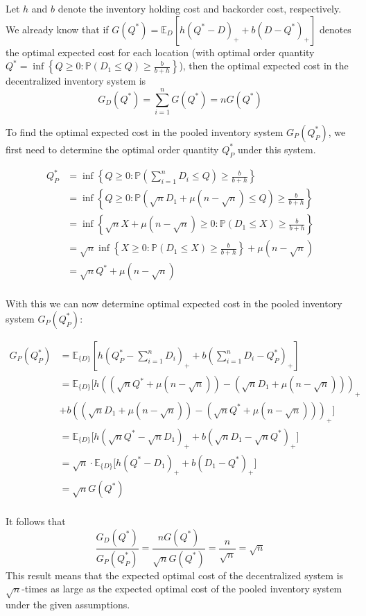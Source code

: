 \documentclass[11pt, oneside]{article}   	%
\begin{document}
Let $h$ and $b$ denote the inventory holding cost and backorder cost, respectively. We already know that if $G(Q^*) = \mathbb{E}_D[h(Q^*-D)_+ + b(D-Q^*)_+]$ denotes the optimal expected cost for each location (with optimal order quantity $Q^* = \inf \left\{ Q \geq 0: \mathbb{P}\left(D_1 \leq Q \right) \geq \frac{b}{b+h} \right\}$), then the optimal expected cost in the decentralized inventory system is
$$G_D(Q^*) = \sum_{i=1}^n G(Q^*) = n G(Q^*)$$

To find the optimal expected cost in the pooled inventory system $G_P(Q_P^*)$, we first need to determine the optimal order quantity $Q_P^*$ under this system.

\begin{align*}
Q_P^* &=  \inf \left\{ Q \geq 0: \mathbb{P}\left( \sum_{i=1}^n D_i \leq Q \right) \geq \frac{b}{b+h} \right\}\\
&=  \inf \left\{ Q \geq 0: \mathbb{P}\left( \sqrt{n}D_1 + \mu (n-\sqrt{n}) \leq Q \right) \geq \frac{b}{b+h} \right\}\\
&=  \inf \left\{ \sqrt{n}X + \mu (n-\sqrt{n}) \geq 0: \mathbb{P}\left(D_1 \leq X \right) \geq \frac{b}{b+h} \right\}\\
&=  \sqrt{n} \inf \left\{ X \geq 0: \mathbb{P}\left(D_1 \leq X \right) \geq \frac{b}{b+h} \right\} + \mu (n-\sqrt{n})\\
&=  \sqrt{n} Q^* + \mu (n-\sqrt{n})\\
\end{align*}

With this we can now determine optimal expected cost in the pooled inventory system $G_P(Q_P^*)$:

\begin{align*}
G_P(Q_P^*) &=  \mathbb{E}_{\{D\}}\left[h(Q_P^* - \sum_{i=1}^n D_i)_+ + b(\sum_{i=1}^n D_i - Q_P^*)_+\right]\\
&=  \mathbb{E}_{\{D\}}\big[h((\sqrt{n} Q^* + \mu (n-\sqrt{n})) - (\sqrt{n}D_1 + \mu (n-\sqrt{n})))_+ \\
&+ b((\sqrt{n}D_1 + \mu (n-\sqrt{n})) - (\sqrt{n} Q^* + \mu (n-\sqrt{n})))_+\big]\\
&=  \mathbb{E}_{\{D\}}\big[h(\sqrt{n} Q^* - \sqrt{n}D_1)_+ + b(\sqrt{n}D_1 - \sqrt{n} Q^* )_+\big]\\
&=  \sqrt{n} \cdot \mathbb{E}_{\{D\}}\big[h( Q^* - D_1)_+ + b(D_1 -  Q^* )_+\big]\\
&=  \sqrt{n} G(Q^*)\\
\end{align*}

It follows that
$$
\frac{G_D(Q^*)}{G_P(Q_P^*)} = \frac{n G(Q^*)}{\sqrt{n} G(Q^*)} = \frac{n}{\sqrt{n}} = \sqrt{n}
$$
This result means that the expected optimal cost of the decentralized system is $\sqrt{n}$-times as large as the expected optimal cost of the pooled inventory system under the given assumptions.
\end{document}
